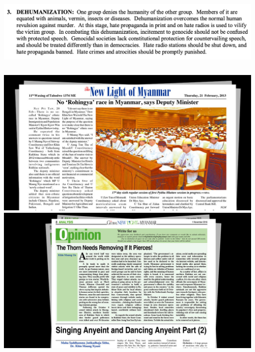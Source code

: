 \documentclass[nobackground,dvipsnames,table,aspectratio=169]{beamer}
\begin{document}
\begin{frame}{}
    \includegraphics[width=\textwidth]{dehumanization}
    \begin{columns}
            \includegraphics[width=\textwidth]{rohingya-myanmar}
            \includegraphics[width=\textwidth]{rohingya-as-a-thorn}
    \end{columns}
\end{frame}
\end{document}
